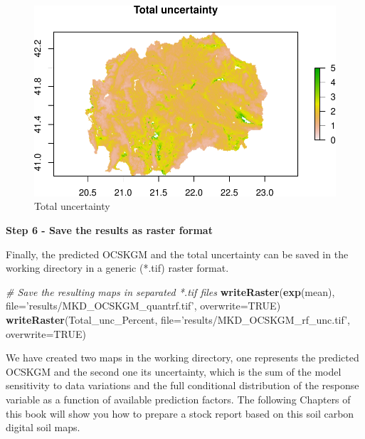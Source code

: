 \documentclass[10pt,b5paper,]{book}
\newenvironment{Shaded}{\begin{snugshade}}{\end{snugshade}}
\newcommand{\CommentTok}[1]{\textcolor[rgb]{0.56,0.35,0.01}{\textit{#1}}}
\newcommand{\DataTypeTok}[1]{\textcolor[rgb]{0.13,0.29,0.53}{#1}}
\newcommand{\KeywordTok}[1]{\textcolor[rgb]{0.13,0.29,0.53}{\textbf{#1}}}
\newcommand{\NormalTok}[1]{#1}
\newcommand{\OtherTok}[1]{\textcolor[rgb]{0.56,0.35,0.01}{#1}}
\newcommand{\StringTok}[1]{\textcolor[rgb]{0.31,0.60,0.02}{#1}}
\theoremstyle{definition}
\theoremstyle{definition}
\theoremstyle{definition}
\theoremstyle{remark}
\begin{document}
\begin{figure}
\centering
\includegraphics{SOCMapping_files/figure-latex/unnamed-chunk-66-1.pdf}
\caption{\label{fig:unnamed-chunk-66}Total uncertainty}
\end{figure}

\textbf{Step 6 - Save the results as raster format}

Finally, the predicted OCSKGM and the total uncertainty can be saved in
the working directory in a generic (*.tif) raster format.

\begin{Shaded}
\begin{Highlighting}[]
\CommentTok{# Save the resulting maps in separated *.tif files}
\KeywordTok{writeRaster}\NormalTok{(}\KeywordTok{exp}\NormalTok{(mean), }\DataTypeTok{file=}\StringTok{'results/MKD_OCSKGM_quantrf.tif'}\NormalTok{, }
            \DataTypeTok{overwrite=}\OtherTok{TRUE}\NormalTok{)}
\KeywordTok{writeRaster}\NormalTok{(Total_unc_Percent, }\DataTypeTok{file=}\StringTok{'results/MKD_OCSKGM_rf_unc.tif'}\NormalTok{,}
            \DataTypeTok{overwrite=}\OtherTok{TRUE}\NormalTok{)}
\end{Highlighting}
\end{Shaded}

We have created two maps in the working directory, one represents the
predicted OCSKGM and the second one its uncertainty, which is the sum of
the model sensitivity to data variations and the full conditional
distribution of the response variable as a function of available
prediction factors. The following Chapters of this book will show you
how to prepare a stock report based on this soil carbon digital soil
maps.

\clearpage
\end{document}

